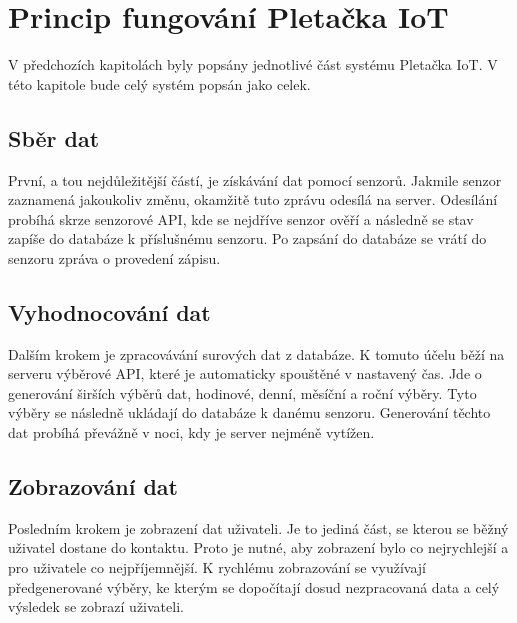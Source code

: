 \chapter{Princip fungování Pletačka IoT}
V předchozích kapitolách byly popsány jednotlivé část systému Pletačka IoT.
V této kapitole bude celý systém popsán jako celek.


\section{Sběr dat}
První, a tou nejdůležitější částí, je získávání dat pomocí senzorů.
Jakmile senzor zaznamená jakoukoliv změnu, okamžitě tuto zprávu odesílá na server.
Odesílání probíhá skrze senzorové API, kde se nejdříve senzor ověří a následně se stav zapíše do databáze k příslušnému senzoru.
Po zapsání do databáze se vrátí do senzoru zpráva o provedení zápisu. 


\section{Vyhodnocování dat}
Dalším krokem je zpracovávání surových dat z databáze.
K tomuto účelu běží na serveru výběrové API, které je automaticky spouštěné v nastavený čas.
Jde o generování širších výběrů dat, hodinové, denní, měsíční a roční výběry.
Tyto výběry se následně ukládají do databáze k danému senzoru.
Generování těchto dat probíhá převážně v noci, kdy je server nejméně vytížen.


\section{Zobrazování dat}
Posledním krokem je zobrazení dat uživateli.
Je to jediná část, se kterou se běžný uživatel dostane do kontaktu.
Proto je nutné, aby zobrazení bylo co nejrychlejší a pro uživatele co nejpříjemnější.
K rychlému zobrazování se využívají předgenerované výběry, ke kterým se dopočítají dosud nezpracovaná data a celý výsledek se zobrazí uživateli.





